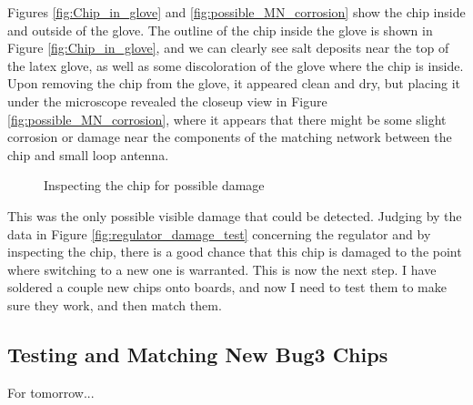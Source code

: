 \documentclass[12pt,onecolumn,titlepage]{article}
\begin{document}
Figures \ref{fig:Chip_in_glove} and \ref{fig:possible_MN_corrosion} show the chip inside and outside of the glove. The outline of the chip inside the glove is shown in Figure \ref{fig:Chip_in_glove}, and we can clearly see salt deposits near the top of the latex glove, as well as some discoloration of the glove where the chip is inside. Upon removing the chip from the glove, it appeared clean and dry, but placing it under the microscope revealed the closeup view in Figure \ref{fig:possible_MN_corrosion}, where it appears that there might be some slight corrosion or damage near the components of the matching network between the chip and small loop antenna.

\begin{figure}[T!]
	\centering
		\quad
	\label{fig:chip_damage_inspection}
	\caption{Inspecting the chip for possible damage}
\end{figure}

This was the only possible visible damage that could be detected. Judging by the data in Figure \ref{fig:regulator_damage_test} concerning the regulator and by inspecting the chip, there is a good chance that this chip is damaged to the point where switching to a new one is warranted. This is now the next step. I have soldered a couple new chips onto boards, and now I need to test them to make sure they work, and then match them. 

\subsection{Testing and Matching New Bug3 Chips}
\indent \indent For tomorrow...


\clearpage
\end{document}
